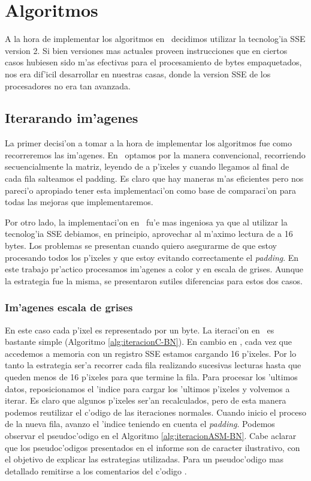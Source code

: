 \section{Algoritmos}
\label{sec:algoritmos}

A la hora de implementar los algoritmos en \ass\ decidimos utilizar la tecnolog'ia SSE version 2. Si bien versiones mas actuales proveen instrucciones que en ciertos casos hubiesen sido m'as efectivas para el procesamiento de bytes empaquetados, nos era dif'icil desarrollar en nuestras casas, donde la version SSE de los procesadores no era tan avanzada.

\subsection{Iterarando im'agenes}
\label{sec:ciclos}
La primer decisi'on a tomar a la hora de implementar los algoritmos fue como recorreremos las im'agenes. En \C\ optamos por la manera convencional, recorriendo secuencialmente la matriz, leyendo de a p'ixeles y cuando llegamos al final de cada fila salteamos el padding. Es claro que hay maneras m'as eficientes pero nos pareci'o apropiado tener esta implementaci'on como base de comparaci'on para todas las mejoras que implementaremos. 

Por otro lado, la implementaci'on en \ass\ fu'e mas ingeniosa ya que al utilizar la tecnolog'ia SSE debiamos, en principio, aprovechar al m'aximo lectura de a 16 bytes. Los problemas se presentan cuando quiero asegurarme de que estoy procesando todos los p'ixeles y que estoy evitando correctamente el \textit{padding}. En este trabajo pr'actico procesamos im'agenes a color y en escala de grises. Aunque la estrategia fue la misma, se presentaron sutiles diferencias para estos dos casos. 


\subsubsection{Im'agenes escala de grises}
En este caso cada p'ixel es representado por un byte. La iteraci'on en \C\ es bastante simple (Algoritmo \ref{alg:iteracionC-BN}). En cambio en \ass, cada vez que accedemos a memoria con un registro SSE estamos cargando 16 p'ixeles. Por lo tanto la estrategia ser'a recorrer cada fila realizando sucesivas lecturas hasta que queden menos de 16 p'ixeles para que termine la fila. Para procesar los 'ultimos datos, reposicionamos el 'indice para cargar los 'ultimos p'ixeles y volvemos a iterar. Es claro que algunos p'ixeles ser'an recalculados, pero de esta manera podemos reutilizar el c'odigo de las iteraciones normales. Cuando inicio el proceso de la nueva fila, avanzo el 'indice teniendo en cuenta el \textit{padding}. Podemos observar el pseudoc'odigo en el Algoritmo \ref{alg:iteracionASM-BN}. Cabe aclarar que los pseudoc'odigos presentados en el informe son de caracter ilustrativo, con el objetivo de explicar las estrategias utilizadas. Para un pseudoc'odigo mas detallado remitirse a los comentarios del c'odigo \ass.

